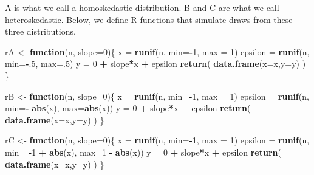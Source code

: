\documentclass[
]{book}
\newenvironment{Shaded}{\begin{snugshade}}{\end{snugshade}}
\newcommand{\AttributeTok}[1]{\textcolor[rgb]{0.13,0.29,0.53}{#1}}
\newcommand{\ControlFlowTok}[1]{\textcolor[rgb]{0.13,0.29,0.53}{\textbf{#1}}}
\newcommand{\DecValTok}[1]{\textcolor[rgb]{0.00,0.00,0.81}{#1}}
\newcommand{\FunctionTok}[1]{\textcolor[rgb]{0.13,0.29,0.53}{\textbf{#1}}}
\newcommand{\NormalTok}[1]{#1}
\newcommand{\OtherTok}[1]{\textcolor[rgb]{0.56,0.35,0.01}{#1}}
\newcommand{\SpecialCharTok}[1]{\textcolor[rgb]{0.81,0.36,0.00}{\textbf{#1}}}
\theoremstyle{definition}
\theoremstyle{definition}
\theoremstyle{definition}
\theoremstyle{definition}
\theoremstyle{remark}
\begin{document}
A is what we call a homoskedastic distribution. B and C are what we call heteroskedastic. Below, we define R functions that simulate draws from these three distributions.

\begin{Shaded}
\begin{Highlighting}[]
\NormalTok{rA }\OtherTok{\textless{}{-}} \ControlFlowTok{function}\NormalTok{(n, }\AttributeTok{slope=}\DecValTok{0}\NormalTok{)\{}
\NormalTok{  x       }\OtherTok{=} \FunctionTok{runif}\NormalTok{(n, }\AttributeTok{min=}\SpecialCharTok{{-}}\DecValTok{1}\NormalTok{, }\AttributeTok{max =} \DecValTok{1}\NormalTok{)}
\NormalTok{  epsilon }\OtherTok{=} \FunctionTok{runif}\NormalTok{(n, }\AttributeTok{min=}\SpecialCharTok{{-}}\NormalTok{.}\DecValTok{5}\NormalTok{, }\AttributeTok{max=}\NormalTok{.}\DecValTok{5}\NormalTok{)}
\NormalTok{  y       }\OtherTok{=} \DecValTok{0} \SpecialCharTok{+}\NormalTok{ slope}\SpecialCharTok{*}\NormalTok{x }\SpecialCharTok{+}\NormalTok{ epsilon}
  \FunctionTok{return}\NormalTok{( }\FunctionTok{data.frame}\NormalTok{(}\AttributeTok{x=}\NormalTok{x,}\AttributeTok{y=}\NormalTok{y) )}
\NormalTok{\}}

\NormalTok{rB }\OtherTok{\textless{}{-}} \ControlFlowTok{function}\NormalTok{(n, }\AttributeTok{slope=}\DecValTok{0}\NormalTok{)\{}
\NormalTok{  x       }\OtherTok{=} \FunctionTok{runif}\NormalTok{(n, }\AttributeTok{min=}\SpecialCharTok{{-}}\DecValTok{1}\NormalTok{, }\AttributeTok{max =} \DecValTok{1}\NormalTok{)}
\NormalTok{  epsilon }\OtherTok{=} \FunctionTok{runif}\NormalTok{(n, }\AttributeTok{min=}\SpecialCharTok{{-}} \FunctionTok{abs}\NormalTok{(x), }\AttributeTok{max=}\FunctionTok{abs}\NormalTok{(x))}
\NormalTok{  y       }\OtherTok{=} \DecValTok{0} \SpecialCharTok{+}\NormalTok{ slope}\SpecialCharTok{*}\NormalTok{x }\SpecialCharTok{+}\NormalTok{ epsilon}
  \FunctionTok{return}\NormalTok{( }\FunctionTok{data.frame}\NormalTok{(}\AttributeTok{x=}\NormalTok{x,}\AttributeTok{y=}\NormalTok{y) )}
\NormalTok{\}}

\NormalTok{rC }\OtherTok{\textless{}{-}} \ControlFlowTok{function}\NormalTok{(n, }\AttributeTok{slope=}\DecValTok{0}\NormalTok{)\{}
\NormalTok{  x       }\OtherTok{=} \FunctionTok{runif}\NormalTok{(n, }\AttributeTok{min=}\SpecialCharTok{{-}}\DecValTok{1}\NormalTok{, }\AttributeTok{max =} \DecValTok{1}\NormalTok{)}
\NormalTok{  epsilon }\OtherTok{=} \FunctionTok{runif}\NormalTok{(n, }\AttributeTok{min=} \SpecialCharTok{{-}}\DecValTok{1} \SpecialCharTok{+} \FunctionTok{abs}\NormalTok{(x), }\AttributeTok{max=}\DecValTok{1} \SpecialCharTok{{-}} \FunctionTok{abs}\NormalTok{(x))}
\NormalTok{  y       }\OtherTok{=} \DecValTok{0} \SpecialCharTok{+}\NormalTok{ slope}\SpecialCharTok{*}\NormalTok{x }\SpecialCharTok{+}\NormalTok{ epsilon}
  \FunctionTok{return}\NormalTok{( }\FunctionTok{data.frame}\NormalTok{(}\AttributeTok{x=}\NormalTok{x,}\AttributeTok{y=}\NormalTok{y) )}
\NormalTok{\}}
\end{Highlighting}
\end{Shaded}
\end{document}
